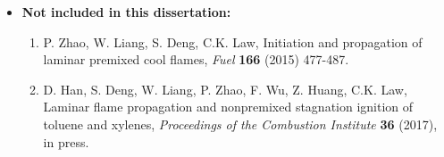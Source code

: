 \begin{itemize}
\begin{enumerate}[resume]
    \end{enumerate}
  \item \textbf{Not included in this dissertation:}
    \begin{enumerate}[resume]
    \item P. Zhao, W. Liang, S. Deng, C.K. Law, Initiation and propagation of laminar premixed cool flames, \textit{Fuel} \textbf{166} (2015) 477-487.
    \item D. Han, S. Deng, W. Liang, P. Zhao, F. Wu, Z. Huang, C.K. Law, Laminar flame propagation and nonpremixed stagnation ignition of toluene and xylenes, \textit{Proceedings of the Combustion Institute} \textbf{36} (2017), in press.
    \end{enumerate}
\end{itemize}

